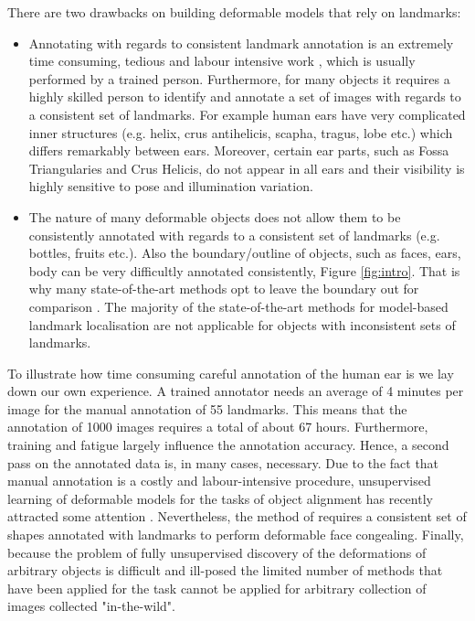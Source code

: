 There are two drawbacks on building deformable models that rely on landmarks: 
\begin{itemize}

\item Annotating with regards to consistent landmark annotation is an extremely time consuming, tedious and labour intensive work \cite{sagonas_iccv_300w_2013}, which is usually performed by a trained person. Furthermore, for many objects it requires a highly skilled person to identify and annotate a set of images with regards to a consistent set of landmarks. For example human ears have very complicated inner structures (e.g. helix, crus antihelicis, scapha, tragus, lobe etc.) which differs remarkably between ears. Moreover, certain ear parts, such as  Fossa Triangularies and Crus Helicis, do not appear in all ears and  their visibility is highly sensitive to pose and illumination variation.

\item The nature of many deformable objects does not allow them to be consistently annotated with regards to a consistent set of landmarks (e.g. bottles, fruits etc.). Also the boundary/outline of objects, such as faces, ears, body can be very difficultly annotated consistently, Figure \ref{fig:intro}. That is why many state-of-the-art methods opt to leave the boundary out for comparison \cite{Tzimiropoulos2014, Asthana2014}. The majority of the state-of-the-art methods for model-based landmark localisation \cite{Cao2012, Zhu2012, Xiong2013, Tzimiropoulos2014, Asthana2014} are not applicable for objects with inconsistent sets of landmarks. 

\end{itemize}

To illustrate how time consuming careful annotation of the human ear is we lay down our own experience. A trained annotator needs an average of 4 minutes per image for the manual annotation of 55 landmarks. This means that the annotation of 1000 images requires a total of about 67 hours. Furthermore,  training and fatigue largely influence the annotation accuracy. Hence, a second pass on the annotated data is, in many cases, necessary. Due to the fact that manual annotation is a costly and labour-intensive procedure, unsupervised learning of deformable models for the tasks of object alignment has recently attracted some attention \cite{kokkinos2007unsupervised, jojic2006escaping, jiang2009learning, liu2009simultaneous, baker2004automatic, cox2008least, cootes2004groupwise, frey2003learning}. Nevertheless, the method of \cite{antonakos2014automatic} requires a consistent set of shapes annotated with landmarks to perform deformable face congealing. Finally, because the problem of fully unsupervised discovery of the deformations of arbitrary objects is difficult and ill-posed the limited number of methods that have been applied for the task cannot be applied for arbitrary collection of images collected "in-the-wild". 


